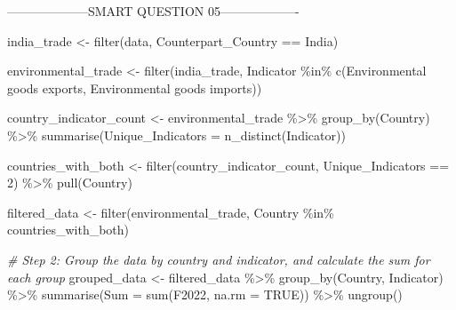 \documentclass[
]{article}
\newenvironment{Shaded}{\begin{snugshade}}{\end{snugshade}}
\newcommand{\AttributeTok}[1]{\textcolor[rgb]{0.77,0.63,0.00}{#1}}
\newcommand{\CommentTok}[1]{\textcolor[rgb]{0.56,0.35,0.01}{\textit{#1}}}
\newcommand{\ConstantTok}[1]{\textcolor[rgb]{0.00,0.00,0.00}{#1}}
\newcommand{\DecValTok}[1]{\textcolor[rgb]{0.00,0.00,0.81}{#1}}
\newcommand{\FunctionTok}[1]{\textcolor[rgb]{0.00,0.00,0.00}{#1}}
\newcommand{\NormalTok}[1]{#1}
\newcommand{\OtherTok}[1]{\textcolor[rgb]{0.56,0.35,0.01}{#1}}
\newcommand{\SpecialCharTok}[1]{\textcolor[rgb]{0.00,0.00,0.00}{#1}}
\newcommand{\StringTok}[1]{\textcolor[rgb]{0.31,0.60,0.02}{#1}}
\begin{document}
--------------------SMART QUESTION 05-------------------

\begin{Shaded}
\begin{Highlighting}[]
\NormalTok{india\_trade }\OtherTok{\textless{}{-}} \FunctionTok{filter}\NormalTok{(data, Counterpart\_Country }\SpecialCharTok{==} \StringTok{\textquotesingle{}India\textquotesingle{}}\NormalTok{)}
\end{Highlighting}
\end{Shaded}

\begin{Shaded}
\begin{Highlighting}[]
\NormalTok{environmental\_trade }\OtherTok{\textless{}{-}} \FunctionTok{filter}\NormalTok{(india\_trade, Indicator }\SpecialCharTok{\%in\%} \FunctionTok{c}\NormalTok{(}\StringTok{\textquotesingle{}Environmental goods exports\textquotesingle{}}\NormalTok{, }\StringTok{\textquotesingle{}Environmental goods imports\textquotesingle{}}\NormalTok{))}
\end{Highlighting}
\end{Shaded}

\begin{Shaded}
\begin{Highlighting}[]
\NormalTok{country\_indicator\_count }\OtherTok{\textless{}{-}}\NormalTok{ environmental\_trade }\SpecialCharTok{\%\textgreater{}\%}
  \FunctionTok{group\_by}\NormalTok{(Country) }\SpecialCharTok{\%\textgreater{}\%}
  \FunctionTok{summarise}\NormalTok{(}\AttributeTok{Unique\_Indicators =} \FunctionTok{n\_distinct}\NormalTok{(Indicator))}
\end{Highlighting}
\end{Shaded}

\begin{Shaded}
\begin{Highlighting}[]
\NormalTok{countries\_with\_both }\OtherTok{\textless{}{-}} \FunctionTok{filter}\NormalTok{(country\_indicator\_count, Unique\_Indicators }\SpecialCharTok{==} \DecValTok{2}\NormalTok{) }\SpecialCharTok{\%\textgreater{}\%}
  \FunctionTok{pull}\NormalTok{(Country)}
\end{Highlighting}
\end{Shaded}

\begin{Shaded}
\begin{Highlighting}[]
\NormalTok{filtered\_data }\OtherTok{\textless{}{-}} \FunctionTok{filter}\NormalTok{(environmental\_trade, Country }\SpecialCharTok{\%in\%}\NormalTok{ countries\_with\_both)}

\CommentTok{\# Step 2: Group the data by country and indicator, and calculate the sum for each group}
\NormalTok{grouped\_data }\OtherTok{\textless{}{-}}\NormalTok{ filtered\_data }\SpecialCharTok{\%\textgreater{}\%}
  \FunctionTok{group\_by}\NormalTok{(Country, Indicator) }\SpecialCharTok{\%\textgreater{}\%}
  \FunctionTok{summarise}\NormalTok{(}\AttributeTok{Sum =} \FunctionTok{sum}\NormalTok{(F2022, }\AttributeTok{na.rm =} \ConstantTok{TRUE}\NormalTok{)) }\SpecialCharTok{\%\textgreater{}\%}
  \FunctionTok{ungroup}\NormalTok{()}
\end{Highlighting}
\end{Shaded}
\end{document}
